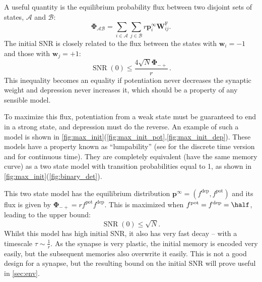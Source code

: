 \documentclass{article} %
\DeclareMathOperator{\snr}{SNR}
\newcommand{\pr}{\mathbf{p}}
\newcommand{\eq}{\pr^\infty}
\newcommand{\w}{\mathbf{w}}
\newcommand{\W}{\mathbf{W}}
\newcommand{\frg}{\W^{\mathrm{F}}}
\newcommand{\F}{\boldsymbol{\Phi}}
\newcommand{\pot}{^{\text{pot}}}
\newcommand{\dep}{^{\text{dep}}}
\newcommand{\CA}{\mathcal{A}}
\newcommand{\CB}{\mathcal{B}}
\begin{document}
A useful quantity is the equilibrium probability flux between two disjoint sets of states, $\CA$ and $\CB$:
%
\begin{equation}\label{eq:flux}
  \F_{\CA\CB} = \sum_{i\in\CA} \sum_{j\in\CB} r \eq_i \frg_{ij}.
\end{equation}
%
The initial SNR is closely related to the flux between the states with $\w_i=-1$ and those with $\w_j=+1$:
%
\begin{equation}\label{eq:initflux}
  \snr(0) \leq \frac{4\sqrt{N}\F_{-+}}{r}\,.
\end{equation}
%
This inequality becomes an equality if potentiation never decreases the synaptic weight and depression never increases it, which should be a property of any sensible model.

To maximize this flux, potentiation from a weak state must be guaranteed to end in a strong state, and depression must do the reverse.
An example of such a model is shown in \autoref{fig:max_init}(\ref{fig:max_init_pot},\ref{fig:max_init_dep}).
These models have a property known as ``lumpability'' (see \cite[\S6.3]{kemeny1960finite} for the discrete time version and \cite{burke1958markovian,Ball1993Lumpability} for continuous time).
They are completely equivalent (\ie have the same memory curve) as a two state model with transition probabilities equal to 1, as shown in \autoref{fig:max_init}(\ref{fig:binary_det}).

This two state model has the equilibrium distribution $\eq=(f\dep,f\pot)$ and its flux is given by $\F_{-+} = rf\pot f\dep$.
This is maximized when $f\pot=f\dep=\half$, leading to the upper bound:
%
\begin{equation}\label{eq:max_init}
  \snr(0) \leq \sqrt{N}.
\end{equation}
%
Whilst this model has high initial SNR, it also has very fast decay -- with a timescale $\tau\sim\frac{1}{r}$.
As the synapse is very plastic, the initial memory is encoded very easily, but the subsequent memories also overwrite it easily.
This is not a good design for a synapse, but the resulting bound on the initial SNR will prove useful in \autoref{sec:env}.
\end{document}
